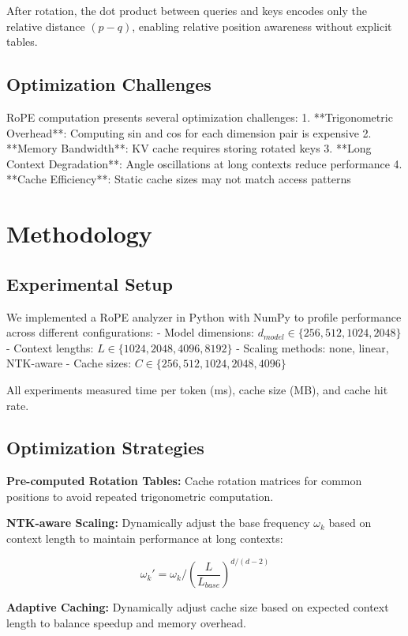 \documentclass[conference]{IEEEtran}
\begin{document}
After rotation, the dot product between queries and keys encodes only the relative distance $(p-q)$, enabling relative position awareness without explicit tables.

\subsection{Optimization Challenges}

RoPE computation presents several optimization challenges:
1. **Trigonometric Overhead**: Computing sin and cos for each dimension pair is expensive
2. **Memory Bandwidth**: KV cache requires storing rotated keys
3. **Long Context Degradation**: Angle oscillations at long contexts reduce performance
4. **Cache Efficiency**: Static cache sizes may not match access patterns

\section{Methodology}

\subsection{Experimental Setup}

We implemented a RoPE analyzer in Python with NumPy to profile performance across different configurations:
- Model dimensions: $d_{model} \in \{256, 512, 1024, 2048\}$
- Context lengths: $L \in \{1024, 2048, 4096, 8192\}$
- Scaling methods: none, linear, NTK-aware
- Cache sizes: $C \in \{256, 512, 1024, 2048, 4096\}$

All experiments measured time per token (ms), cache size (MB), and cache hit rate.

\subsection{Optimization Strategies}

\textbf{Pre-computed Rotation Tables:} Cache rotation matrices for common positions to avoid repeated trigonometric computation.

\textbf{NTK-aware Scaling:} Dynamically adjust the base frequency $\omega_k$ based on context length to maintain performance at long contexts:

\[
\omega_k' = \omega_k / \left( \frac{L}{L_{base}} \right)^{d/(d-2)}
\]

\textbf{Adaptive Caching:} Dynamically adjust cache size based on expected context length to balance speedup and memory overhead.
\end{document}

